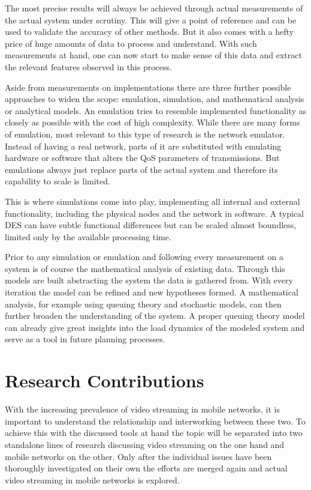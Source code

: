 The most precise results will always be achieved through actual measurements of the actual system under scrutiny. This will give a point of reference and can be used to validate the accuracy of other methods. But it also comes with a hefty price of huge amounts of data to process and understand. With such measurements at hand, one can now start to make sense of this data and extract the relevant features observed in this process.

Aside from measurements on implementations there are three further possible approaches to widen the scope: emulation, simulation, and mathematical analysis or analytical models. An emulation tries to resemble implemented functionality as closely as possible with the cost of high complexity. While there are many forms of emulation, most relevant to this type of research is the network emulator. Instead of having a real network, parts of it are substituted with emulating hardware or software that alters the \gls{QoS} parameters of transmissions. But emulations always just replace parts of the actual system and therefore its capability to scale is limited.

This is where simulations come into play, implementing all internal and external functionality, including the physical nodes and the network in software. A typical \gls{DES} can have subtle functional differences but can be scaled almost boundless, limited only by the available processing time. 

Prior to any simulation or emulation and following every measurement on a system is of course the mathematical analysis of existing data. Through this models are built abstracting the system the data is gathered from. With every iteration the model can be refined and new hypotheses formed.
A mathematical analysis, for example using queuing theory and stochastic models, can then further broaden the understanding of the system. A proper queuing theory model can already give great insights into the load dynamics of the modeled system and serve as a tool in future planning processes.


\section{Research Contributions}

With the increasing prevalence of video streaming in mobile networks, it is important to understand the relationship and interworking between these two. To achieve this with the discussed tools at hand the topic will be separated into two standalone lines of research discussing video streaming on the one hand and mobile networks on the other. Only after the individual issues have been thoroughly investigated on their own the efforts are merged again and actual video streaming in mobile networks is explored.

